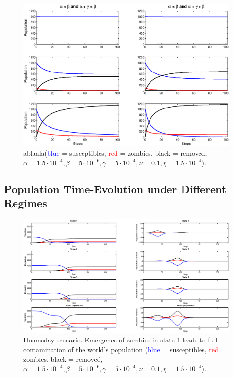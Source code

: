 \documentclass[11pt]{article} %
\begin{document}
\begin{figure}[h!]
\centerline{
\includegraphics[scale=0.55]{../images/Matlab_figures/model-AltB.eps}}
\caption{ablaala(\textcolor{blue}{blue} = susceptibles, \textcolor{red}{red} = zombies, black = removed, $\alpha=1.5\cdot10^{-4}, \beta=5\cdot10^{-6}, \gamma=5\cdot10^{-4}, \nu=0.1, \eta=1.5\cdot10^{-4}$). \label{doomsday} }
\end{figure}


\subsection{Population Time-Evolution under Different Regimes}\indent
 
\begin{figure}[h!]
\centerline{
\includegraphics[scale=0.35]{../images/Matlab_figures/example_doomsday.eps}}
\caption{Doomsday scenario. Emergence of zombies in state 1 leads to full contamination of the world's population (\textcolor{blue}{blue} = susceptibles, \textcolor{red}{red} = zombies, black = removed, $\alpha=1.5\cdot10^{-4}, \beta=5\cdot10^{-6}, \gamma=5\cdot10^{-4}, \nu=0.1, \eta=1.5\cdot10^{-4}$). \label{doomsday} }
\end{figure}
\end{document}
